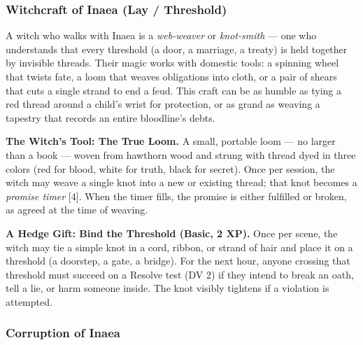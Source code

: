 \subsubsection*{Witchcraft of Inaea (Lay / Threshold)}

A witch who walks with Inaea is a \textit{web-weaver} or \textit{knot-smith} --- one who understands that every threshold (a door, a marriage, a treaty) is held together by invisible threads. Their magic works with domestic tools: a spinning wheel that twists fate, a loom that weaves obligations into cloth, or a pair of shears that cuts a single strand to end a feud. This craft can be as humble as tying a red thread around a child's wrist for protection, or as grand as weaving a tapestry that records an entire bloodline's debts.

\textbf{The Witch's Tool: The True Loom.} A small, portable loom --- no larger than a book --- woven from hawthorn wood and strung with thread dyed in three colors (red for blood, white for truth, black for secret). Once per session, the witch may weave a single knot into a new or existing thread; that knot becomes a \emph{promise timer} [4]. When the timer fills, the promise is either fulfilled or broken, as agreed at the time of weaving.

\textbf{A Hedge Gift: Bind the Threshold (Basic, 2 XP).} Once per scene, the witch may tie a simple knot in a cord, ribbon, or strand of hair and place it on a threshold (a doorstep, a gate, a bridge). For the next hour, anyone crossing that threshold must succeed on a Resolve test (DV 2) if they intend to break an oath, tell a lie, or harm someone inside. The knot visibly tightens if a violation is attempted.

\subsubsection*{Corruption of Inaea}

